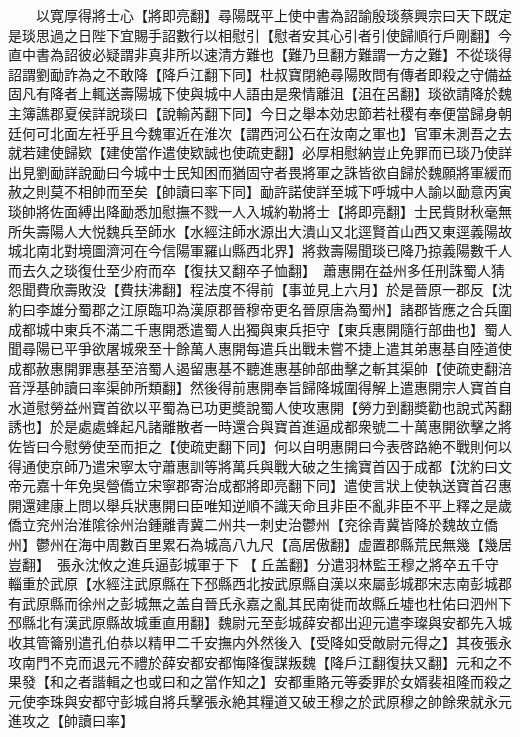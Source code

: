 　　以寛厚得將士心【將即亮翻】尋陽既平上使中書為詔諭殷琰蔡興宗曰天下既定是琰思過之日陛下宜賜手詔數行以相慰引【慰者安其心引者引使歸順行戶剛翻】今直中書為詔彼必疑謂非真非所以速清方難也【難乃旦翻方難謂一方之難】不從琰得詔謂劉勔詐為之不敢降【降戶江翻下同】杜叔寶閉絶尋陽敗問有傳者即殺之守備益固凡有降者上輒送壽陽城下使與城中人語由是衆情離沮【沮在呂翻】琰欲請降於魏主簿譙郡夏侯詳說琰曰【說輸芮翻下同】今日之舉本効忠節若社稷有奉便當歸身朝廷何可北面左衽乎且今魏軍近在淮次【謂西河公石在汝南之軍也】官軍未測吾之去就若建使歸欵【建使當作遣使欵誠也使疏吏翻】必厚相慰納豈止免罪而已琰乃使詳出見劉勔詳說勔曰今城中士民知困而猶固守者畏將軍之誅皆欲自歸於魏願將軍緩而赦之則莫不相帥而至矣【帥讀曰率下同】勔許諾使詳至城下呼城中人諭以勔意丙寅琰帥將佐面縛出降勔悉加慰撫不戮一人入城約勒將士【將即亮翻】士民貲財秋毫無所失壽陽人大悦魏兵至師水【水經注師水源出大潰山又北逕賢首山西又東逕義陽故城北南北對境圖濟河在今信陽軍羅山縣西北界】將救壽陽聞琰已降乃掠義陽數千人而去久之琰復仕至少府而卒【復扶又翻卒子恤翻】　蕭惠開在益州多任刑誅蜀人猜怨聞費欣壽敗没【費扶沸翻】程法度不得前【事並見上六月】於是晉原一郡反【沈約曰李雄分蜀郡之江原臨卭為漢原郡晉穆帝更名晉原唐為蜀州】諸郡皆應之合兵圍成都城中東兵不滿二千惠開悉遣蜀人出獨與東兵拒守【東兵惠開隨行部曲也】蜀人聞尋陽已平爭欲屠城衆至十餘萬人惠開每遣兵出戰未嘗不捷上遣其弟惠基自陸道使成都赦惠開罪惠基至涪蜀人遏留惠基不聽進惠基帥部曲擊之斬其渠帥【使疏吏翻涪音浮基帥讀曰率渠帥所類翻】然後得前惠開奉旨歸降城圍得解上遣惠開宗人寶首自水道慰勞益州寶首欲以平蜀為已功更奬說蜀人使攻惠開【勞力到翻奬勸也說式芮翻誘也】於是處處蜂起凡諸離散者一時還合與寶首進逼成都衆號二十萬惠開欲擊之將佐皆曰今慰勞使至而拒之【使疏吏翻下同】何以自明惠開曰今表啓路絶不戰則何以得通使京師乃遣宋寧太守蕭惠訓等將萬兵與戰大破之生擒寶首囚于成都【沈約曰文帝元嘉十年免吳營僑立宋寧郡寄治成都將即亮翻下同】遣使言狀上使執送寶首召惠開還建康上問以舉兵狀惠開曰臣唯知逆順不識天命且非臣不亂非臣不平上釋之是歲僑立兖州治淮隂徐州治鍾離青冀二州共一刺史治鬱州【兖徐青冀皆降於魏故立僑州】鬱州在海中周數百里累石為城高八九尺【高居傲翻】虚置郡縣荒民無幾【幾居豈翻】　張永沈攸之進兵逼彭城軍于下【丘盖翻】分遣羽林監王穆之將卒五千守輜重於武原【水經注武原縣在下邳縣西北按武原縣自漢以來屬彭城郡宋志南彭城郡有武原縣而徐州之彭城無之盖自晉氏永嘉之亂其民南徙而故縣丘墟也杜佑曰泗州下邳縣北有漢武原縣故城重直用翻】魏尉元至彭城薛安都出迎元遣李璨與安都先入城收其管籥别遣孔伯恭以精甲二千安撫内外然後入【受降如受敵尉元得之】其夜張永攻南門不克而退元不禮於薛安都安都悔降復謀叛魏【降戶江翻復扶又翻】元和之不果發【和之者諧輯之也或曰和之當作知之】安都重賂元等委罪於女婿裴祖隆而殺之元使李珠與安都守彭城自將兵擊張永絶其糧道又破王穆之於武原穆之帥餘衆就永元進攻之【帥讀曰率】

